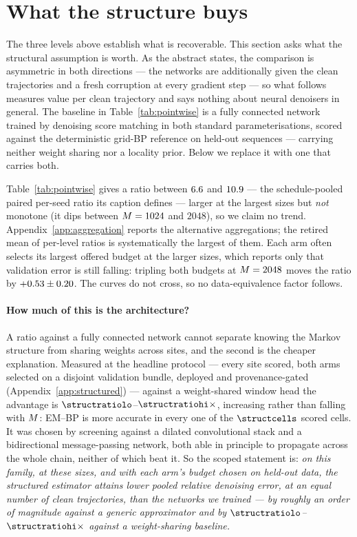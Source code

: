\documentclass{article}
\theoremstyle{definition}
\theoremstyle{plain}
\begin{document}
\section{What the structure buys}
\label{sec:networks}

The three levels above establish what is recoverable. This section asks what the structural
assumption is worth. As the abstract states, the
comparison is asymmetric in both directions --- the networks are additionally given the clean
trajectories and a fresh corruption at every gradient step --- so what follows measures value per
clean trajectory and says nothing about neural denoisers in general. The baseline in Table~\ref{tab:pointwise} is a
fully connected network trained by denoising score matching in both standard parameterisations,
scored against the deterministic grid-BP reference on held-out sequences --- carrying neither
weight sharing nor a locality prior. Below we replace it with one that carries both.



Table~\ref{tab:pointwise} gives a ratio between $6.6$ and $10.9$ --- the schedule-pooled
paired per-seed ratio its caption defines --- larger at the largest sizes but \emph{not} monotone (it dips between $M=1024$ and
$2048$), so we claim no trend.
Appendix~\ref{app:aggregation} reports the alternative aggregations; the retired mean of
per-level ratios is systematically the largest of them. Each arm often selects its largest
offered budget at the larger sizes, which reports only that validation error is still falling:
tripling both budgets at $M=2048$ moves the ratio by $+0.53 \pm 0.20$.
The curves do not cross, so no data-equivalence factor follows.

\paragraph{How much of this is the architecture?} A ratio against a fully connected network cannot
separate knowing the Markov structure from sharing weights across sites, and the second is the
cheaper explanation. Measured at the headline protocol --- every site scored, both arms selected
on a disjoint validation bundle, deployed and provenance-gated (Appendix~\ref{app:structured}) ---
against a weight-shared window head the advantage is $\structratiolo$--$\structratiohi\times$,
increasing rather than falling with $M$: EM--BP is more accurate in every one of the
$\structcells$ scored cells. It was chosen by screening against a dilated convolutional stack
and a bidirectional message-passing network, both able in principle to propagate across the
whole chain, neither of which beat it. So the scoped statement is:
\emph{on this family, at these sizes, and with each arm's budget chosen on held-out data, the
structured estimator attains lower pooled relative denoising error, at an equal number of clean
trajectories, than the networks we trained --- by roughly an order of magnitude against a generic
approximator and by $\structratiolo$--$\structratiohi\times$ against a weight-sharing baseline.}
\end{document}

